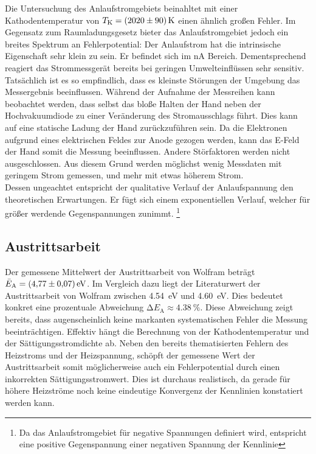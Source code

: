 Die Untersuchung des Anlaufstromgebiets beinahltet mit einer Kathodentemperatur von $T_\text{K} = \qty{2020\pm90}{\kelvin}$ einen ähnlich 
großen Fehler. Im Gegensatz zum Raumladungsgesetz bieter das Anlaufstromgebiet jedoch ein breites Spektrum an Fehlerpotential:
Der Anlaufstrom hat die intrinsische Eigenschaft sehr klein zu sein. Er befindet sich im \unit{\nano \ampere} Bereich. 
Dementsprechend reagiert das Strommessgerät bereits bei geringen Umwelteinflüssen sehr sensitiv. Tatsächlich ist es so empfindlich, dass es kleinste Störungen 
der Umgebung das Messergebnis beeinflussen. Während der Aufnahme der Messreihen kann beobachtet werden, dass selbst das 
bloße Halten der Hand neben der Hochvakuumdiode zu einer Veränderung des Stromausschlags führt. Dies kann auf eine statische 
Ladung der Hand zurückzuführen sein. Da die Elektronen aufgrund eines elektrischen Feldes zur Anode gezogen werden, kann das 
E-Feld der Hand somit die Messung beeinflussen. Andere Störfaktoren werden nicht ausgeschlossen. Aus diesem Grund werden 
möglichst wenig Messdaten mit geringem Strom gemessen, und mehr mit etwas höherem Strom. \\
\noindent Dessen ungeachtet entspricht der qualitative Verlauf der Anlaufspannung den theoretischen Erwartungen. Er fügt sich 
einem exponentiellen Verlauf, welcher für größer werdende Gegenspannungen zunimmt. \footnote{Da das Anlaufstromgebiet für 
negative Spannungen definiert wird, entspricht eine positive Gegenspannung einer negativen Spannung der Kennlinie} 


\subsection{Austrittsarbeit}

Der gemessene Mittelwert der Austrittsarbeit von Wolfram beträgt $\bar{E}_\text{A} = \qty{4.77\pm0.07}{\electronvolt}$. Im Vergleich dazu 
liegt der Literaturwert der Austrittsarbeit von Wolfram zwischen \qty{4.54}{\electronvolt} und \qty{4.60}{\electronvolt}\cite{Austrittsarbeit}.
Dies bedeutet konkret eine prozentuale Abweichung $\increment{}E_\text{A} \approx \qty{4.38}{\percent}$. Diese Abweichung zeigt bereits, dass augenscheinlich keine 
markanten systematischen Fehler die Messung beeinträchtigen. Effektiv hängt die Berechnung von der Kathodentemperatur und der Sättigungsstromdichte ab.
Neben den bereits thematisierten Fehlern des Heizstroms und der Heizspannung, schöpft der gemessene Wert der Austrittsarbeit somit möglicherweise 
auch ein Fehlerpotential durch einen inkorrekten Sättigungsstromwert. Dies ist durchaus realistisch, da gerade für höhere Heizströme noch keine 
eindeutige Konvergenz der Kennlinien konstatiert werden kann.


%
